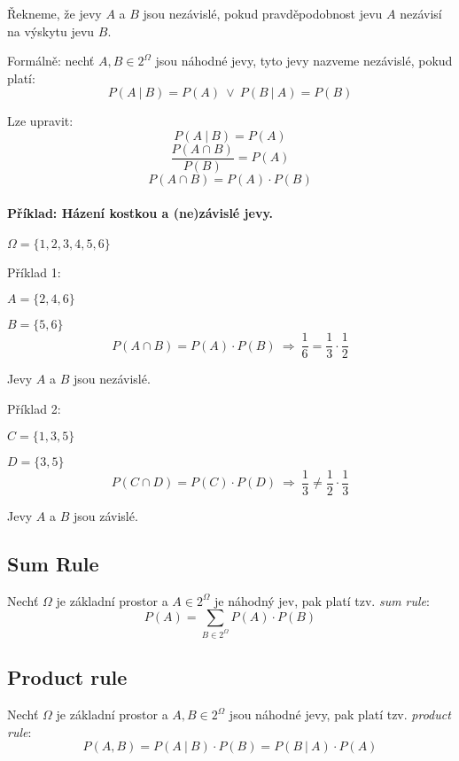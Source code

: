 \begin{compactitem}
    \item Řekneme, že jevy $A$ a $B$ jsou nezávislé, pokud pravděpodobnost jevu $A$ nezávisí na výskytu jevu $B$.

    \item Formálně: nechť $A, B \in 2^{\Omega}$ jsou náhodné jevy, tyto jevy nazveme nezávislé, pokud platí:
    $$ P(A ~|~ B) = P(A) ~\lor~ P(B ~|~ A) = P(B)$$

    \item Lze upravit:
    $$ P(A ~|~ B) = P(A) $$
    $$ \frac{P(A \cap B)}{P(B)} = P(A) $$
    $$ P(A \cap B) = P(A) \cdot P(B) $$

\end{compactitem}

\paragraph*{Příklad: Házení kostkou a (ne)závislé jevy.}

\begin{compactitem}
    \item $\Omega = \{ 1,2,3,4,5,6 \}$
    \item Příklad 1: \begin{compactitem}
        \item $A = \{ 2,4,6 \}$
        \item $B = \{ 5,6 \}$
        $$ P(A \cap B) = P(A) \cdot P(B) ~\Rightarrow~ \frac{1}{6} = \frac{1}{3} \cdot \frac{1}{2} $$
        \item Jevy $A$ a $B$ jsou nezávislé.
    \end{compactitem}

    \item Příklad 2: \begin{compactitem}
        \item $C = \{ 1,3,5 \}$
        \item $D = \{ 3,5 \}$
        $$ P(C \cap D) = P(C) \cdot P(D) ~\Rightarrow~ \frac{1}{3} \not= \frac{1}{2} \cdot \frac{1}{3} $$
        \item Jevy $A$ a $B$ jsou závislé.
    \end{compactitem}
\end{compactitem}

\subsection{Sum Rule}

\begin{compactitem}
    \item Nechť $\Omega$ je základní prostor a $A \in 2^{\Omega}$ je náhodný jev, pak platí tzv. \textit{sum rule}:
    $$ P(A) = \sum_{B \in 2^{\Omega}} P(A) \cdot P(B)$$
\end{compactitem}

\subsection{Product rule}

\begin{compactitem}
    \item Nechť $\Omega$ je základní prostor a $A, B \in 2^{\Omega}$ jsou náhodné jevy, pak platí tzv. \textit{product rule}:
    $$ P(A, B) = P(A ~|~ B) \cdot P(B) = P(B ~|~ A) \cdot P(A) $$
\end{compactitem}
